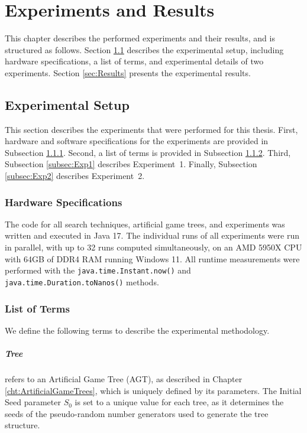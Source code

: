 \chapter{Experiments and Results}
\label{cht:Experiments}
This chapter describes the performed experiments and their results, and is structured as follows.
Section \ref{sec:ExpSetup} describes the experimental setup, including hardware specifications, a list of terms, and experimental details of two experiments. Section \ref{sec:Results} presents the experimental results.

\section{Experimental Setup}
\label{sec:ExpSetup}
This section describes the experiments that were performed for this thesis. First, hardware and software specifications for the experiments are provided in Subsection \ref{subsec:Hardware}. Second, a list of terms is provided in Subsection \ref{subsec:ExpTerms}. Third, Subsection \ref{subsec:Exp1} describes Experiment\ 1. Finally, Subsection \ref{subsec:Exp2} describes Experiment\ 2.

\subsection{Hardware Specifications}
\label{subsec:Hardware}
The code for all search techniques, artificial game trees, and experiments was written and executed in Java 17. The individual runs of all experiments were run in parallel, with up to 32 runs computed simultaneously, on an AMD 5950X CPU with 64GB of DDR4 RAM running Windows 11. All runtime measurements were performed with the \texttt{java.time.Instant.now()} and \texttt{java.time.Duration.toNanos()} methods.

\subsection{List of Terms}
\label{subsec:ExpTerms}
We define the following terms to describe the experimental methodology.

\paragraph{Tree}
refers to an Artificial Game Tree (AGT), as described in Chapter \ref{cht:ArtificialGameTrees}, which is uniquely defined by its parameters. The Initial Seed parameter $S_0$ is set to a unique value for each tree, as it determines the seeds of the pseudo-random number generators used to generate the tree structure.
